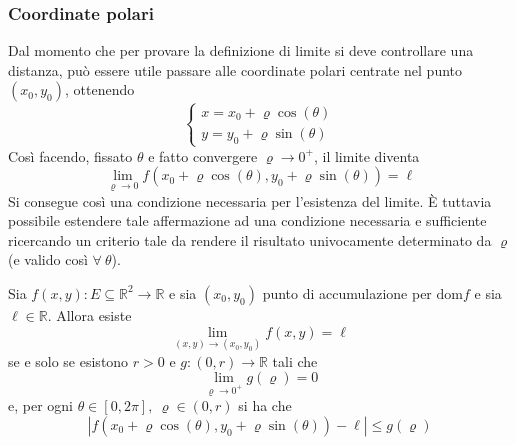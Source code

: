 \subsubsection{Coordinate polari}
Dal momento che per provare la definizione di limite si deve controllare una distanza, può essere utile passare alle coordinate polari centrate nel punto $(x_0, y_0)$, ottenendo
\begin{equation*}
    \begin{cases}
        x=x_0+ \varrho \cos(\theta)\\
        y=y_0+ \varrho \sin(\theta)
    \end{cases}
\end{equation*}
Così facendo, fissato $\theta$ e fatto convergere $\varrho \to 0^+$, il limite diventa
\begin{equation*}
    \lim_{\varrho\to 0}{f(x_0+\varrho\cos(\theta), y_0+\varrho\sin(\theta))}=\ell
\end{equation*}
Si consegue così una condizione necessaria per l'esistenza del limite. È tuttavia possibile estendere tale affermazione ad una condizione necessaria e sufficiente ricercando un criterio tale da rendere il risultato univocamente determinato da $\varrho$ (e valido così $\forall\ \theta$).
\begin{theorem} \label{Teo: Condizione necessaria e sufficiente per un limite}
    Sia $f(x,y): E \subseteq \mathbb{R}^2 \to \mathbb{R}$ e sia $(x_0, y_0)$ punto di accumulazione per $\text{dom}f$ e sia $\ell \in \mathbb{R}$. Allora esiste
    \begin{equation*}
        \lim_{(x,y)\to(x_0, y_0)}f(x,y)=\ell
    \end{equation*}
    se e solo se esistono $r>0$ e $g:(0, r) \to \mathbb{R}$ tali che
    \begin{equation*}
        \lim_{\varrho \to 0^+}{g(\varrho)=0}
    \end{equation*}
    e, per ogni $\theta \in [0, 2\pi],\ \varrho\in (0, r)$ si ha che 
    \begin{equation*}
        \left|f(x_0+\varrho\cos(\theta), y_0+\varrho\sin(\theta))-\ell \right|\leq g(\varrho)
    \end{equation*}
\end{theorem}
